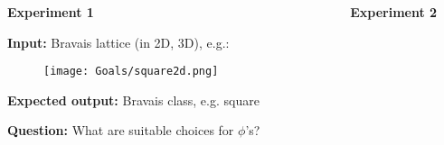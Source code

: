 \vspace{-0.5cm}
\begin{columns}[T]
    \begin{column}{0.49\textwidth}
        \textbf{Experiment 1}\par
        \textbf{Input:} Bravais lattice (in 2D, 3D), e.g.:
        \begin{figure}
            \centering
            \texttt{[image: Goals/square2d.png]}                        
        \end{figure}
        \textbf{Expected output:} Bravais class, e.g. square\par
        \textbf{Question:} What are suitable choices for $\phi$'s?
    \end{column}
    \begin{column}{0.01\textwidth}
    \end{column}
    \begin{column}{0.49\textwidth}
        \textbf{Experiment 2}\par 
    \end{column}
\end{columns}